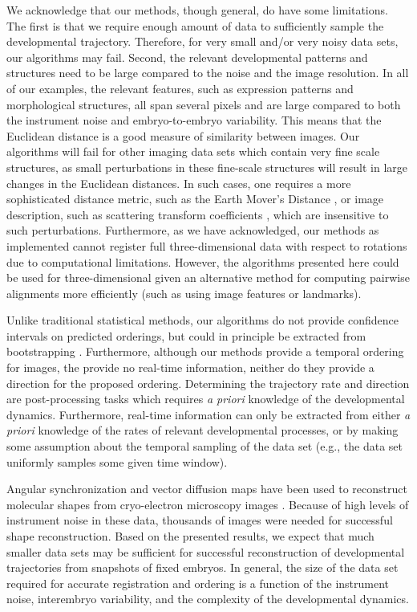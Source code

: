\documentclass[twocolumn, 10pt]{article}
\begin{document}
We acknowledge that our methods, though general, do have some limitations. 
%
The first is that we require enough amount of data to sufficiently sample the developmental trajectory.
%
Therefore, for very small and/or very noisy data sets, our algorithms may fail. 
%
Second, the relevant developmental patterns and structures need to be large compared to the noise and the image resolution. 
%
In all of our examples, the relevant features, such as expression patterns and morphological structures, all span several pixels and are large compared to both the instrument noise and embryo-to-embryo variability. 
%
This means that the Euclidean distance is a good measure of similarity between images.
%
Our algorithms will fail for other imaging data sets which contain very fine scale structures,  as small perturbations in these fine-scale structures will result in large changes in the Euclidean distances. 
%
In such cases, one requires a more sophisticated distance metric, such as the Earth Mover's Distance \citep{rubner2000earth}, or image description, such as scattering transform coefficients \citep{mallat2012group}, which are insensitive to such perturbations. 
%
Furthermore, as we have acknowledged, our methods as implemented cannot register full three-dimensional data with respect to rotations due to computational limitations. 
%
However, the algorithms presented here could be used for three-dimensional given an alternative method for computing pairwise alignments more efficiently (such as using image features or landmarks).

Unlike traditional statistical methods, our algorithms do not provide confidence intervals on predicted orderings, but could in principle be extracted from bootstrapping \citep{efron1979bootstrap}.
%
Furthermore, although our methods provide a temporal ordering for images, the provide no real-time information, neither do they provide a direction for the proposed ordering.
%
Determining the trajectory rate and direction are post-processing tasks which requires {\em a priori} knowledge of the developmental dynamics. 
%
Furthermore, real-time information can only be extracted from either {\em a priori} knowledge of the rates of relevant developmental processes, or by making some assumption about the temporal sampling of the data set (e.g., the data set uniformly samples some given time window). 

Angular synchronization and vector diffusion maps have been used to reconstruct molecular shapes from cryo-electron microscopy images \citep{singer2012vector, zhao2014rotationally, singer2011viewing}.
%
Because of high levels of instrument noise in these data, thousands of images were needed for successful shape reconstruction. 
%
Based on the presented results, we expect that much smaller data sets may be sufficient for successful reconstruction of developmental trajectories from snapshots of fixed embryos.
%
In general, the size of the data set required for accurate registration and ordering is a function of the instrument noise, interembryo variability, and the complexity of the developmental dynamics.
%
\end{document}
